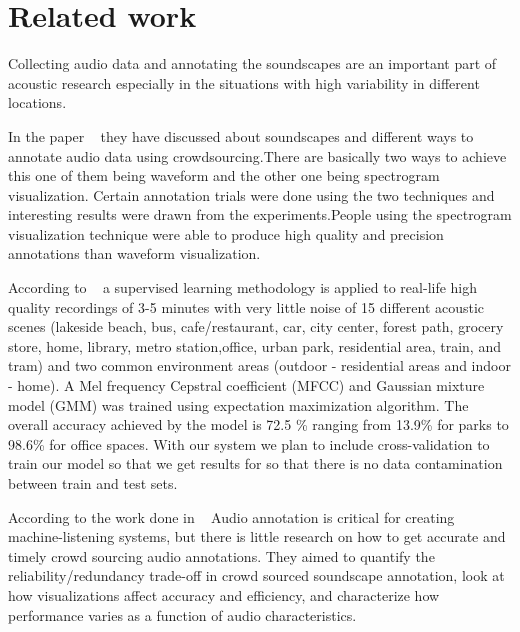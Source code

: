 
\section{Related work}
Collecting audio data and annotating the soundscapes are an important part of acoustic research especially in the situations with high variability in different locations.

In the paper ~\cite{5} they have discussed about soundscapes and different ways to annotate audio data using crowdsourcing.There are basically two ways to achieve this one of them being waveform and the other one being spectrogram visualization. Certain annotation trials were done using the two techniques and interesting results were drawn from the experiments.People using the spectrogram visualization technique were able to produce high quality and precision annotations than waveform visualization.

According to ~\cite{6} a supervised learning methodology is applied to real-life high quality recordings of 3-5 minutes with very little noise of 15 different acoustic scenes (lakeside beach, bus, cafe/restaurant, car, city center, forest path, grocery store, home, library, metro station,office, urban park, residential area, train, and tram) and two common environment areas (outdoor - residential areas and indoor - home). A Mel frequency Cepstral coefficient (MFCC) and Gaussian mixture model (GMM) was trained using expectation maximization algorithm. The overall accuracy achieved by the model is 72.5 \% ranging from 13.9\% for parks to 98.6\% for office spaces. With our system we plan to include cross-validation to train our model so that we get results for so that there is no data contamination between train and test sets.

According to the work done in ~\cite{4} Audio annotation is critical for creating machine-listening systems, but there is little research on how to get accurate and timely crowd sourcing audio annotations. They aimed to quantify the reliability/redundancy trade-off in crowd sourced soundscape annotation, look at how visualizations affect accuracy and efficiency, and characterize how performance varies as a function of audio characteristics.   

